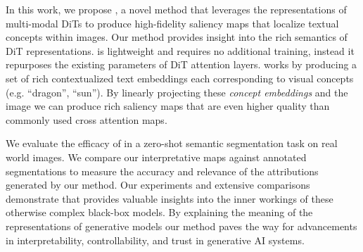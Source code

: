 In this work, we propose \tool{}, a novel method that leverages the representations of multi-modal DiTs to produce high-fidelity saliency maps that localize textual concepts within images. Our method provides insight into the rich semantics of DiT representations. \tool{} is lightweight and requires no additional training, instead it repurposes the existing parameters of DiT attention layers. \tool{} works by producing a set of rich contextualized text embeddings each corresponding to visual concepts (e.g. ``dragon'', ``sun''). By linearly projecting these \textit{concept embeddings} and the image we can produce rich saliency maps that are even higher quality than commonly used cross attention maps. 










We evaluate the efficacy of \tool{} in a zero-shot semantic segmentation task on real world images. 
We compare our interpretative maps against annotated segmentations to measure the accuracy and relevance of the attributions generated by our method.   Our experiments and extensive comparisons demonstrate that \tool{} provides valuable insights into the inner workings of these otherwise complex black-box models. By explaining the meaning of the representations of generative models our method paves the way for advancements in interpretability, controllability, and trust in generative AI systems. 

